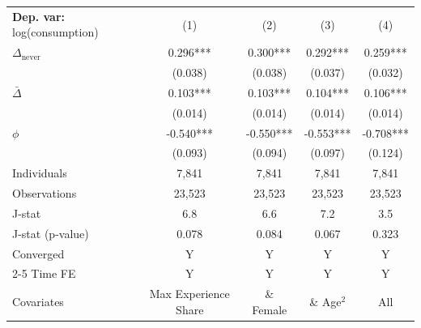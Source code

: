 \begin{tabular}{l cccc} \toprule  \textbf{Dep. var:}  log(consumption) 
                    &\multicolumn{1}{c}{(1)}   &\multicolumn{1}{c}{(2)}   &\multicolumn{1}{c}{(3)}   &\multicolumn{1}{c}{(4)}   \\

\addlinespace
$\Delta_{\text{never}}$&       0.296***&       0.300***&       0.292***&       0.259***\\
                    &     (0.038)   &     (0.038)   &     (0.037)   &     (0.032)   \\

\addlinespace
$\bar{\Delta}$      &       0.103***&       0.103***&       0.104***&       0.106***\\
                    &     (0.014)   &     (0.014)   &     (0.014)   &     (0.014)   \\

\addlinespace
$\phi$              &      -0.540***&      -0.550***&      -0.553***&      -0.708***\\
                    &     (0.093)   &     (0.094)   &     (0.097)   &     (0.124)   \\
\addlinespace
Individuals         &       7,841   &       7,841   &       7,841   &       7,841   \\
Observations        &      23,523   &      23,523   &      23,523   &      23,523   \\
J-stat              &         6.8   &         6.6   &         7.2   &         3.5   \\
J-stat (p-value)    &       0.078   &       0.084   &       0.067   &       0.323   \\
Converged           &           Y   &           Y   &           Y   &           Y   \\
\cmidrule{2-5} Time FE & Y & Y & Y & Y \\ Covariates & Max Experience Share & \& Female & \& Age$^2$ & All \\ \bottomrule \end{tabular}
